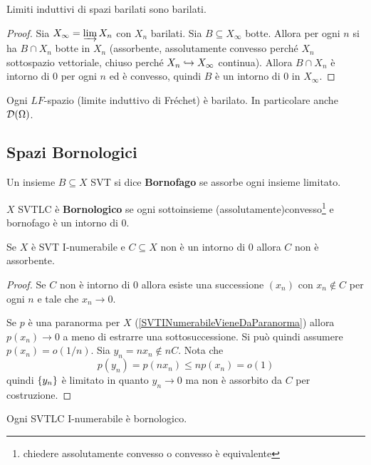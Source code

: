 \begin{remark}
Limiti induttivi di spazi barilati sono barilati.
\end{remark}
\begin{proof}
Sia $X_\infty=\varinjlim X_n$ con $X_n$ barilati. Sia $B\subseteq X_\infty$ botte. Allora per ogni $n$ si ha $B\cap X_n$ botte in $X_n$ (assorbente, assolutamente convesso perch\'e $X_n$ sottospazio vettoriale, chiuso perch\'e $X_n\hookrightarrow X_\infty$ continua). Allora $B\cap X_n$ \`e intorno di $0$ per ogni $n$ ed \`e convesso, quindi $B$ \`e un intorno di $0$ in $X_\infty$.
\end{proof}
\begin{corollary}
    Ogni $LF$-spazio (limite induttivo di Fr\'echet) \`e barilato. In particolare anche $\mathcal{D}(\Omega)$.
\end{corollary}




\subsection{Spazi Bornologici}

\begin{definition}
Un insieme $B\subseteq X$ SVT si dice \textbf{Bornofago} se assorbe ogni insieme limitato.
\smallskip

\noindent
$X$ SVTLC \`e \textbf{Bornologico} se ogni sottoinsieme (assolutamente)convesso\footnote{chiedere assolutamente convesso o convesso \`e equivalente} e bornofago \`e un intorno di $0$.
\end{definition}

\begin{proposition}\label{PrInInumerabileAssorbenteImplicaIntornoDi0}
    Se $X$ \`e SVT I-numerabile e $C\subseteq X$ non \`e un intorno di $0$ allora $C$ non \`e assorbente.
\end{proposition}
\begin{proof}
Se $C$ non \`e intorno di $0$ allora esiste una successione $(x_n)$ con $x_n\notin C$ per ogni $n$ e tale che $x_n\to 0$.

Se $p$ \`e una paranorma per $X$ (\ref{SVTINumerabileVieneDaParanorma}) allora $p(x_n)\to 0$ a meno di estrarre una sottosuccessione. Si pu\`o quindi assumere $p(x_n)=o(1/n)$. Sia $y_n=nx_n\notin nC$. Nota che
\[p(y_n)=p(nx_n)\leq np(x_n)=o(1)\]
quindi $\left\{{y_n}\right\}$ \`e limitato in quanto $y_n\to 0$ ma non \`e assorbito da $C$ per costruzione. 
\end{proof}
\begin{corollary}
Ogni SVTLC I-numerabile \`e bornologico.
\end{corollary}

